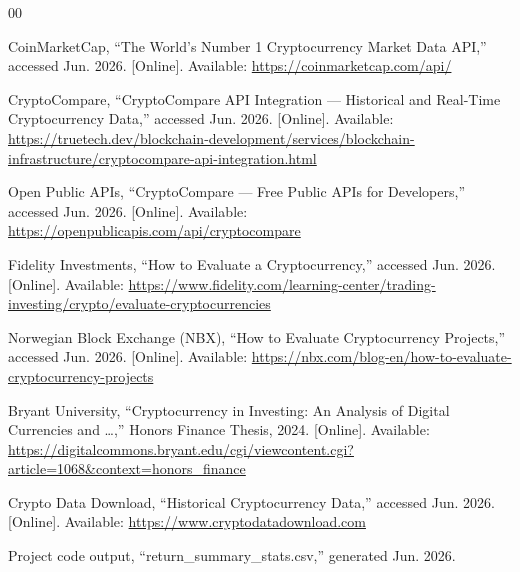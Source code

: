 \documentclass[conference]{IEEEtran}
\begin{document}
\begin{thebibliography}{00}

CoinMarketCap, ``The World's Number 1 Cryptocurrency Market Data API,'' accessed Jun. 2026. [Online]. Available: \url{https://coinmarketcap.com/api/}

CryptoCompare, ``CryptoCompare API Integration --- Historical and Real-Time Cryptocurrency Data,'' accessed Jun. 2026. [Online]. Available: \url{https://truetech.dev/blockchain-development/services/blockchain-infrastructure/cryptocompare-api-integration.html}

Open Public APIs, ``CryptoCompare --- Free Public APIs for Developers,'' accessed Jun. 2026. [Online]. Available: \url{https://openpublicapis.com/api/cryptocompare}

Fidelity Investments, ``How to Evaluate a Cryptocurrency,'' accessed Jun. 2026. [Online]. Available: \url{https://www.fidelity.com/learning-center/trading-investing/crypto/evaluate-cryptocurrencies}

Norwegian Block Exchange (NBX), ``How to Evaluate Cryptocurrency Projects,'' accessed Jun. 2026. [Online]. Available: \url{https://nbx.com/blog-en/how-to-evaluate-cryptocurrency-projects}

Bryant University, ``Cryptocurrency in Investing: An Analysis of Digital Currencies and \ldots,'' Honors Finance Thesis, 2024. [Online]. Available: \url{https://digitalcommons.bryant.edu/cgi/viewcontent.cgi?article=1068&context=honors_finance}

Crypto Data Download, ``Historical Cryptocurrency Data,'' accessed Jun. 2026. [Online]. Available: \url{https://www.cryptodatadownload.com}

Project code output, ``return\_summary\_stats.csv,'' generated Jun. 2026.

\end{thebibliography}
\end{document}
